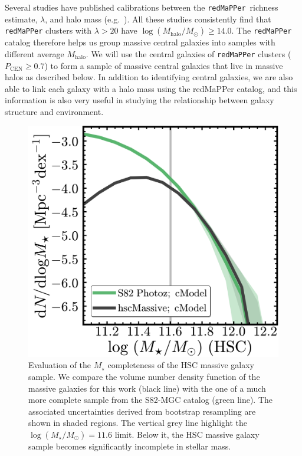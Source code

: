 \documentclass[a4paper,fleqn,usenatbib]{mnras}
\def\redm{\texttt{redMaPPer}}
\def\mstar{{$M_{\star}$}}
\def\mhalo{{$M_{\mathrm{halo}}$}}
\def\logms{{$\log (M_{\star}/M_{\odot})$}}
\begin{document}
    Several studies have published calibrations between the \redm{}~richness estimate, 
    $\lambda$, and halo mass (e.g.\ \citealt{Saro2015, Farahi2016, Simet2016, 
    Melchior2016}). 
    All these studies consistently find that \redm{} clusters with $\lambda > 20$ 
    have $\log (M_{\mathrm{halo}}/M_{\odot}) \geq 14.0$. 
    The \redm{} catalog therefore helps us group massive central galaxies into 
    samples with different average \mhalo{}. 
    We will use the central galaxies of \redm{} clusters 
    ($P_{\mathrm{CEN}} \geq 0.7$) to form a sample of massive central galaxies that 
    live in massive halos as described below. In addition to identifying central galaxies, 
    we are also able to link each galaxy with a halo mass using the redMaPPer catalog, and 
    this information is also very useful in studying the 
    relationship between galaxy structure and environment.

  \begin{figure}
      \centering 
      \includegraphics[width=\columnwidth]{fig/redbcg_completeness}
      \caption{
          Evaluation of the \mstar{} completeness of the HSC massive galaxy sample.
          We compare the volume number density function of the massive galaxies 
          for this work (black line) with the one of a much more complete sample
          from the S82-MGC catalog (green line).  
          The associated uncertainties derived from bootstrap resampling are shown in 
          shaded regions. 
          The vertical grey line highlight the \logms{}$=11.6$ limit.  
          Below it, the HSC massive galaxy sample becomes significantly incomplete in 
          stellar mass. 
          }
      \label{fig:mass_complete}
  \end{figure}     
 
\end{document}
